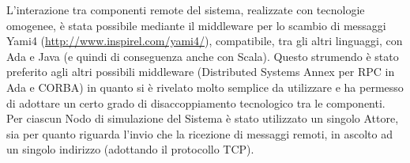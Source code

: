 L'interazione tra componenti remote del sistema, realizzate con tecnologie omogenee, è stata possibile mediante il middleware per lo scambio di messaggi Yami4 (\url{http://www.inspirel.com/yami4/}), compatibile, tra gli altri linguaggi, con Ada e Java (e quindi di conseguenza anche con Scala). Questo strumendo è stato preferito agli altri possibili middleware (Distributed Systems Annex per RPC in Ada e CORBA) in quanto si è rivelato molto semplice da utilizzare e ha permesso di adottare un certo grado di disaccoppiamento tecnologico tra le componenti. Per ciascun Nodo di simulazione del Sistema è stato utilizzato un singolo Attore, sia per quanto riguarda l'invio che la ricezione di messaggi remoti, in ascolto ad un singolo indirizzo (adottando il protocollo TCP). 




